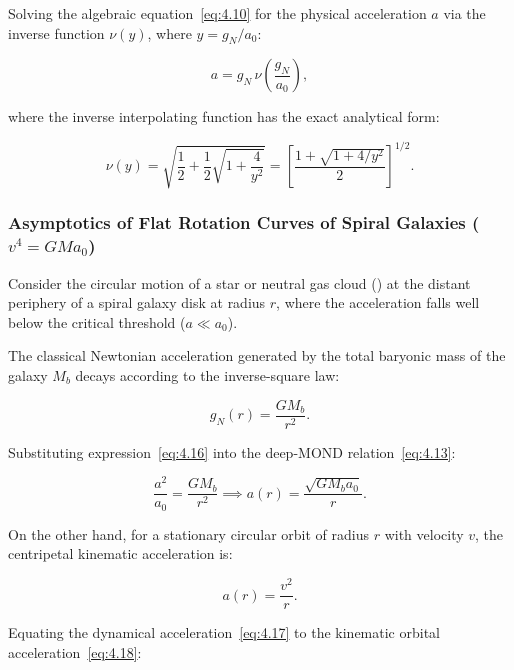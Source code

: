 Solving the algebraic equation~\eqref{eq:4.10} for the physical acceleration $a$ via the inverse function $\nu(y)$, where $y = g_N / a_0$:

\begin{equation}\label{eq:4.14}\tag{4.14}
a = g_N \, \nu\left( \frac{g_N}{a_0} \right),
\end{equation}

where the inverse interpolating function has the exact analytical form:

\begin{equation}\label{eq:4.15}\tag{4.15}
\nu(y) = \sqrt{\frac{1}{2} + \frac{1}{2}\sqrt{1 + \frac{4}{y^2}}} = \left[ \frac{1 + \sqrt{1 + 4/y^2}}{2} \right]^{1/2}.
\end{equation}


\subsubsection{Asymptotics of Flat Rotation Curves of Spiral Galaxies ($v^4 = G M a_0$)}\label{sec:4.2.2}

Consider the circular motion of a star or neutral gas cloud () at the distant periphery of a spiral galaxy disk at radius $r$, where the acceleration falls well below the critical threshold ($a \ll a_0$).

The classical Newtonian acceleration generated by the total baryonic mass of the galaxy $M_b$ decays according to the inverse-square law:

\begin{equation}\label{eq:4.16}\tag{4.16}
g_N(r) = \frac{G M_b}{r^2}.
\end{equation}

Substituting expression~\eqref{eq:4.16} into the deep-MOND relation~\eqref{eq:4.13}:

\begin{equation}\label{eq:4.17}\tag{4.17}
\frac{a^2}{a_0} = \frac{G M_b}{r^2} \implies a(r) = \frac{\sqrt{G M_b a_0}}{r}.
\end{equation}

On the other hand, for a stationary circular orbit of radius $r$ with velocity $v$, the centripetal kinematic acceleration is:

\begin{equation}\label{eq:4.18}\tag{4.18}
a(r) = \frac{v^2}{r}.
\end{equation}

Equating the dynamical acceleration~\eqref{eq:4.17} to the kinematic orbital acceleration~\eqref{eq:4.18}:

